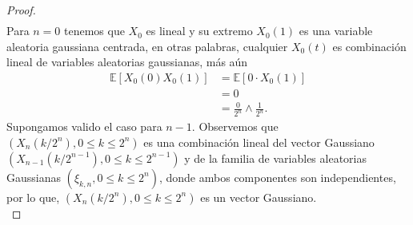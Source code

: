 \begin{proof}
\begin{align}
	\end{align}
Para $n = 0$ tenemos que $X_0$ es lineal y su extremo $X_0(1)$ es  una variable aleatoria gaussiana centrada, en otras palabras, cualquier $X_0(t)$ es combinación lineal de variables aleatorias gaussianas, más aún
	\begin{align*}
		\mathbb{E} \left[ X_0 (0) X_0 (1) \right] & = \mathbb{E} \left[ 0 \cdot X_0 (1) \right] \\
		& = 0 \\
		& = \frac{0}{2^n} \wedge \frac{1}{2^n}.
	\end{align*}
Supongamos valido el caso para $n - 1$. Observemos que $(X_n (k / 2^n), 0 \leq k \leq 2^n)$ es una combinación lineal del vector Gaussiano $(X_{n-1} (k / 2^{n-1}), 0 \leq k \leq 2^{n-1})$ y de la familia de variables aleatorias Gaussianas $(\xi_{k, n}, 0 \leq k \leq 2^n)$, donde ambos componentes son independientes, por lo que, $(X_n (k / 2^n), 0 \leq k \leq 2^n)$  es un vector Gaussiano. \\


\end{proof}
